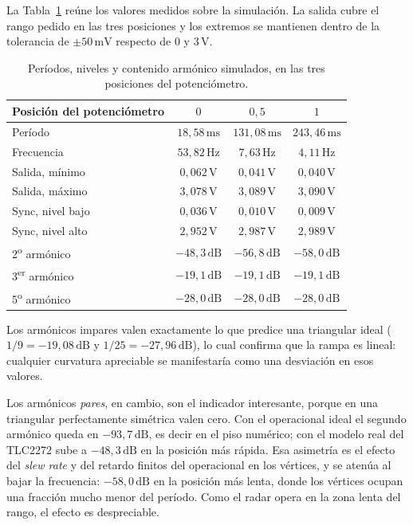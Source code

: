 \documentclass[12pt, a4paper, twoside]{report}
\begin{document}
La Tabla~\ref{tab:tri_niveles} reúne los valores medidos sobre la
simulación. La salida cubre el rango pedido en las tres posiciones y los
extremos se mantienen dentro de la tolerancia de $\pm 50\,\text{mV}$
respecto de $0$ y $3\,\text{V}$.

\begin{table}[H]
  \centering
  \caption{Períodos, niveles y contenido armónico simulados, en las tres
  posiciones del potenciómetro.}
  \label{tab:tri_niveles}
  \begin{tabular}{lccc}
    \toprule
    Posición del potenciómetro & $0$ & $0{,}5$ & $1$ \\
    \midrule
    Período                  & $18{,}58\,\text{ms}$ & $131{,}08\,\text{ms}$ & $243{,}46\,\text{ms}$ \\
    Frecuencia               & $53{,}82\,\text{Hz}$ & $7{,}63\,\text{Hz}$   & $4{,}11\,\text{Hz}$ \\
    Salida, mínimo           & $0{,}062\,\text{V}$  & $0{,}041\,\text{V}$   & $0{,}040\,\text{V}$ \\
    Salida, máximo           & $3{,}078\,\text{V}$  & $3{,}089\,\text{V}$   & $3{,}090\,\text{V}$ \\
    Sync, nivel bajo         & $0{,}036\,\text{V}$  & $0{,}010\,\text{V}$   & $0{,}009\,\text{V}$ \\
    Sync, nivel alto         & $2{,}952\,\text{V}$  & $2{,}987\,\text{V}$   & $2{,}989\,\text{V}$ \\
    \midrule
    2\textsuperscript{o} armónico & $-48{,}3\,\text{dB}$ & $-56{,}8\,\text{dB}$ & $-58{,}0\,\text{dB}$ \\
    3\textsuperscript{er} armónico & $-19{,}1\,\text{dB}$ & $-19{,}1\,\text{dB}$ & $-19{,}1\,\text{dB}$ \\
    5\textsuperscript{o} armónico & $-28{,}0\,\text{dB}$ & $-28{,}0\,\text{dB}$ & $-28{,}0\,\text{dB}$ \\
    \bottomrule
  \end{tabular}
\end{table}

Los armónicos impares valen exactamente lo que predice una triangular
ideal ($1/9 = -19{,}08\,\text{dB}$ y $1/25 = -27{,}96\,\text{dB}$), lo cual
confirma que la rampa es lineal: cualquier curvatura apreciable se
manifestaría como una desviación en esos valores.

Los armónicos \emph{pares}, en cambio, son el indicador interesante, porque
en una triangular perfectamente simétrica valen cero. Con el operacional
ideal el segundo armónico queda en $-93{,}7\,\text{dB}$, es decir en el piso
numérico; con el modelo real del TLC2272 sube a $-48{,}3\,\text{dB}$ en la
posición más rápida. Esa asimetría es el efecto del \textit{slew rate} y del
retardo finitos del operacional en los vértices, y se atenúa al bajar la
frecuencia: $-58{,}0\,\text{dB}$ en la posición más lenta, donde los
vértices ocupan una fracción mucho menor del período. Como el radar opera en
la zona lenta del rango, el efecto es despreciable.
\end{document}
